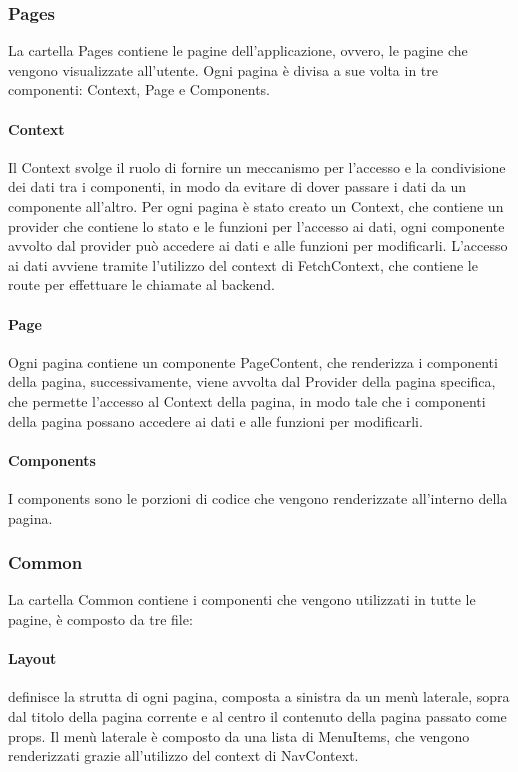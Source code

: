\subsubsection{Pages}
La cartella Pages contiene le pagine dell'applicazione, ovvero, le pagine che vengono visualizzate all'utente. Ogni pagina è divisa a sue volta in tre componenti: Context, Page e Components.\\

\paragraph{Context}
Il Context svolge il ruolo di fornire un meccanismo per l'accesso e la condivisione dei dati tra i componenti, in modo da evitare di dover passare i dati da un componente all'altro. Per ogni pagina è stato creato un Context, che contiene un provider che contiene lo stato e le funzioni per l'accesso ai dati, ogni componente avvolto dal provider può accedere ai dati e alle funzioni per modificarli. L'accesso ai dati avviene tramite l'utilizzo del context di FetchContext, che contiene le route per effettuare le chiamate al backend.\\

\paragraph{Page}
Ogni pagina contiene un componente PageContent, che renderizza i componenti della pagina, successivamente, viene avvolta dal Provider della pagina specifica, che permette l'accesso al Context della pagina, in modo tale che i componenti della pagina possano accedere ai dati e alle funzioni per modificarli.\\

\paragraph{Components}
I components sono le porzioni di codice che vengono renderizzate all'interno della pagina.

\subsubsection{Common}
La cartella Common contiene i componenti che vengono utilizzati in tutte le pagine, è composto da tre file:

\paragraph{Layout} definisce la strutta di ogni pagina, composta a sinistra da un menù laterale, sopra dal titolo della pagina corrente e al centro il contenuto della pagina passato come props.
Il menù laterale è composto da una lista di MenuItems, che vengono renderizzati grazie all'utilizzo del context di NavContext.

